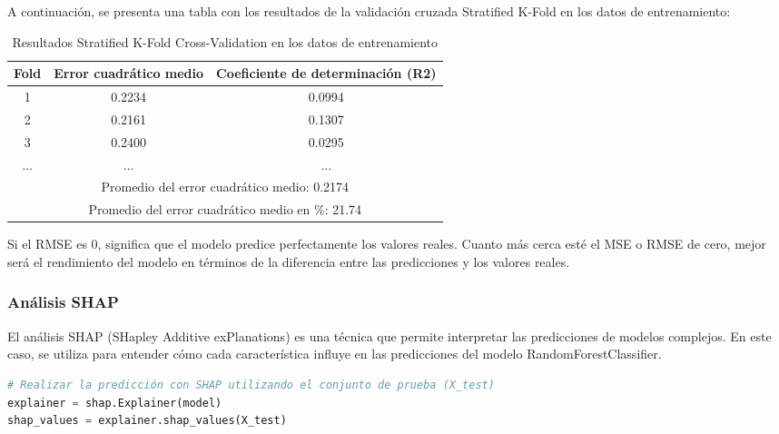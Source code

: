 A continuación, se presenta una tabla con los resultados de la validación cruzada Stratified K-Fold en los datos de entrenamiento:

\begin{table}[h]
    \centering
    \caption{Resultados Stratified K-Fold Cross-Validation en los datos de entrenamiento}
    \label{lst:res_skfold_train}
    \begin{tabular}{|c|c|c|}
        \hline
        \textbf{Fold} & \textbf{Error cuadrático medio} & \textbf{Coeficiente de determinación (R2)} \\
        \hline
        1             & 0.2234                          & 0.0994                                     \\
        2             & 0.2161                          & 0.1307                                     \\
        3             & 0.2400                          & 0.0295                                     \\
        ...           & ...                             & ...                                        \\
        \hline
        \multicolumn{3}{|c|}{Promedio del error cuadrático medio: 0.2174}                            \\
        \multicolumn{3}{|c|}{Promedio del error cuadrático medio en \%: 21.74}                       \\
        \hline
    \end{tabular}
\end{table}

Si el RMSE es 0, significa que el modelo predice perfectamente los valores reales. Cuanto más cerca esté el MSE o RMSE de cero, mejor será el rendimiento del modelo en términos de la diferencia entre las predicciones y los valores reales.


\subsubsection{Análisis SHAP}

El análisis SHAP (SHapley Additive exPlanations) es una técnica que permite interpretar las predicciones de modelos complejos. En este caso, se utiliza para entender cómo cada característica influye en las predicciones del modelo RandomForestClassifier.

\begin{lstlisting}[language=Python, caption=Predicción con SHAP utilizando el conjunto de prueba, label=lst:shap_analysis]
# Realizar la predicción con SHAP utilizando el conjunto de prueba (X_test)
explainer = shap.Explainer(model)
shap_values = explainer.shap_values(X_test)
\end{lstlisting}


